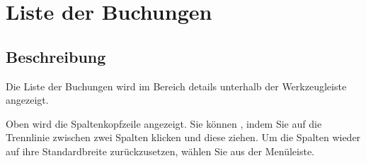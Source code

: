 \section{Liste der Buchungen\label{transactions-list}}


\subsection{Beschreibung\label{transactions-list-description}}

Die Liste der Buchungen wird im Bereich details unterhalb der Werkzeugleiste angezeigt.

Oben wird die Spaltenkopfzeile angezeigt. Sie können , indem Sie auf die Trennlinie zwischen zwei Spalten klicken und diese ziehen. Um die Spalten wieder auf ihre Standardbreite zurückzusetzen, wählen Sie  aus der Menüleiste.

